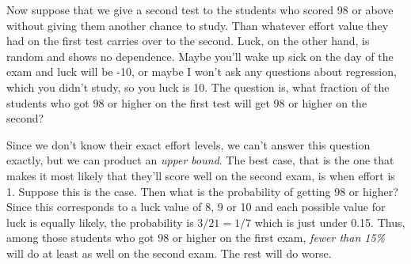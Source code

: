 \documentclass[12pt]{article}
\begin{document}
Now suppose that we give a second test to the students who scored 98 or above without giving them another chance to study.
Than whatever effort value they had on the first test carries over to the second.
Luck, on the other hand, is random and shows no dependence.
Maybe you'll wake up sick on the day of the exam and luck will be -10, or maybe I won't ask any questions about regression, which you didn't study, so you luck is 10.
The question is, what fraction of the students who got 98 or higher on the first test will get 98 or higher on the second?

Since we don't know their exact effort levels, we can't answer this question exactly, but we can product an \emph{upper bound}.
The best case, that is the one that makes it most likely that they'll score well on the second exam, is when effort is 1.
Suppose this is the case.
Then what is the probability of getting 98 or higher?
Since this corresponds to a luck value of 8, 9 or 10 and each possible value for luck is equally likely, the probability is $3/21 = 1/7$ which is just under 0.15.
Thus, among those students who got 98 or higher on the first exam, \emph{fewer than 15\%} will do at least as well on the second exam.
The rest will do worse.
\end{document}
